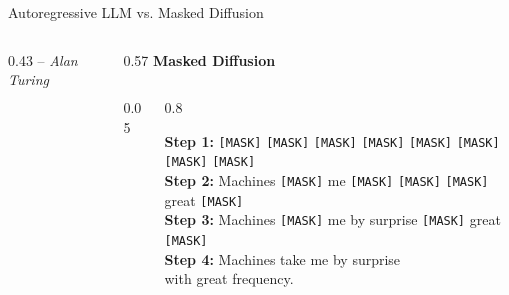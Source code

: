 \documentclass[normaltitle,first=orange,second=red,leqno]{aaltoslides}
\newcommand{\mask}{\texttt{[MASK]}}
\newcommand{\graybox}[1]{\colorbox{maskgray}{#1}}
\newcommand{\greenbox}[1]{\colorbox{diffgreen}{#1}}
\begin{document}
\begin{frame}{Autoregressive LLM vs. Masked Diffusion}
\begin{columns}[T]
\begin{column}{0.43\textwidth}
            -- \textit{Alan Turing}
        \end{column}

        \begin{column}{0.57\textwidth}
            \centering
            \textbf{\large Masked Diffusion}\\
            
            \begin{columns}[T]
                \begin{column}{0.05\textwidth}
                    \centering
                    \vspace{1.2cm}
                \end{column}
                
                \begin{column}{0.8\textwidth}
                    \raggedright
                    \footnotesize
                    \textbf{Step 1:} \graybox{\mask} \graybox{\mask} \graybox{\mask} \graybox{\mask} \graybox{\mask} \graybox{\mask} \graybox{\mask} \graybox{\mask}\\[0.25cm]
                    
                    \textbf{Step 2:} \greenbox{Machines} \graybox{\mask} \greenbox{me} \graybox{\mask} \graybox{\mask} \graybox{\mask} \greenbox{great} \graybox{\mask}\\[0.25cm]
                    
                    \textbf{Step 3:} \greenbox{Machines} \graybox{\mask} \greenbox{me by surprise} \graybox{\mask} \greenbox{great} \graybox{\mask}\\[0.25cm]
                    
                    \textbf{Step 4:} \greenbox{Machines take me by surprise}\\
                    \greenbox{with great frequency.}
                \end{column}


\end{columns}
\end{column}
\end{columns}
\end{frame}
\end{document}
